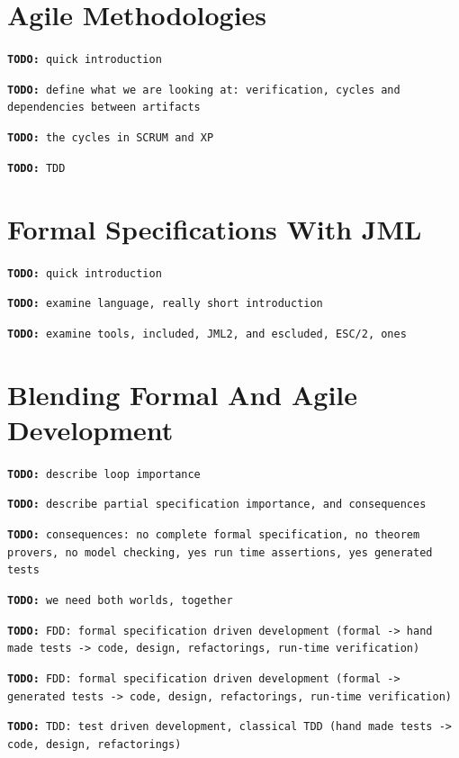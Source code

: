 \documentclass{article} \usepackage{times}
\newcommand{\todo}[1]{\texttt{\textbf{TODO:} #1}}
\begin{document}
\section{Agile Methodologies}
\label{sec:agile_methodologies}

\todo{quick introduction}

\todo{define what we are looking at: verification, cycles and dependencies between artifacts}

\todo{the cycles in SCRUM and XP}

\todo{TDD}



\section{Formal Specifications With JML}
\label{sec:formal_specifications_using_jml}

\todo{quick introduction}

\todo{examine language, really short introduction}

\todo{examine tools, included, JML2, and escluded, ESC/2, ones}



\section{Blending Formal And Agile Development}
\label{sec:blending_formal_and_agile_development}

\todo{describe loop importance}

\todo{describe partial specification importance, and consequences}

\todo{consequences: no complete formal specification, no theorem provers, no model checking, yes run time assertions, yes generated tests}

\todo{we need both worlds, together}

\todo{FDD: formal specification driven development (formal -> hand made tests -> code, design, refactorings, run-time verification)}

\todo{FDD: formal specification driven development (formal -> generated tests -> code, design, refactorings, run-time verification)}

\todo{TDD: test driven development, classical TDD (hand made tests -> code, design, refactorings)}
\end{document}
